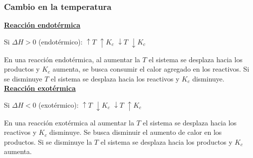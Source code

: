         \subsubsection{Cambio en la temperatura} 
        \textbf{\underline{Reacción endotérmica}}   \begin{center} Si $\Delta H > 0$ (endotérmico): $\uparrow T$ $\uparrow K_c$ \hspace{10pt} $\downarrow T$ $\downarrow K_c$  \end{center}
        \sangria{} En una reacción endotérmica, al aumentar la $T$ el sistema se desplaza hacia los productos y $K_c$ aumenta, se busca consumir el calor agregado en los reactivos. Si se disminuye $T$ el sistema se desplaza hacia los reactivos y $K_c$ disminuye. \\[5pt]
        \textbf{\underline{Reacción exotérmica}}
           \begin{center} Si $\Delta H < 0$ (exotérmico): $\uparrow T$ $\downarrow K_c$ \hspace{10pt} $\downarrow T$ $\uparrow K_c$ \end{center} \sangria{} En una reacción exotérmica al aumentar la $T$ el sistema se desplaza hacia los reactivos y $K_c$ disminuye. Se busca disminuir el aumento de calor en los productos. Si se disminuye la $T$ el sistema se desplaza hacia los productos y $K_c$ aumenta. \saltoPag{}
